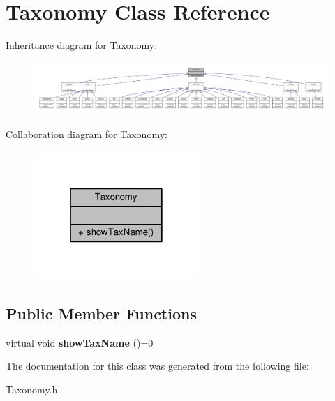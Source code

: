\hypertarget{classTaxonomy}{}\section{Taxonomy Class Reference}
\label{classTaxonomy}


Inheritance diagram for Taxonomy\+:
\nopagebreak
\begin{figure}[H]
\begin{center}
\leavevmode
\includegraphics[width=350pt]{classTaxonomy__inherit__graph}
\end{center}
\end{figure}


Collaboration diagram for Taxonomy\+:
\nopagebreak
\begin{figure}[H]
\begin{center}
\leavevmode
\includegraphics[width=178pt]{classTaxonomy__coll__graph}
\end{center}
\end{figure}
\subsection*{Public Member Functions}
\begin{DoxyCompactItemize}
\item 
virtual void {\bfseries show\+Tax\+Name} ()=0\hypertarget{classTaxonomy_aedc7597a50cc7fd4d6bdcbe370e8a414}{}\label{classTaxonomy_aedc7597a50cc7fd4d6bdcbe370e8a414}

\end{DoxyCompactItemize}


The documentation for this class was generated from the following file\+:\begin{DoxyCompactItemize}
\item 
Taxonomy.\+h\end{DoxyCompactItemize}
